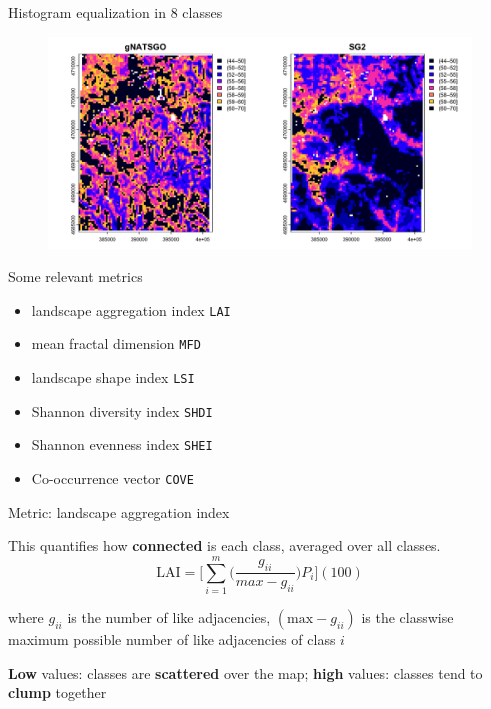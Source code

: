 \documentclass[aspectratio=169, 10pt]{beamer}
\begin{document}
\begin{frame}{Histogram equalization in 8 classes}
    \begin{figure}
        \centering
\includegraphics[height=0.8\textheight]{graphics_david/show.classified-1.png}
    \end{figure}
\end{frame}

\begin{frame}{Some relevant metrics}
\begin{itemize}
    \item landscape aggregation index \texttt{LAI}
    \item mean fractal dimension \texttt{MFD}
    \item landscape shape index \texttt{LSI}
    \item Shannon diversity index \texttt{SHDI}
    \item Shannon evenness index \texttt{SHEI}
    \item Co-occurrence vector \texttt{COVE}
\end{itemize}    
\end{frame}

\begin{frame}{Metric: landscape aggregation index}

This quantifies how \textbf{connected} is each class, averaged over all classes.
    $$\mathrm{LAI} = \Bigg[∑_{i=1}^m \Big( \frac{g_{ii}}{max-g_{ii}} \Big) P_{i} \Bigg](100)$$
    
    where $g_{ii}$ is the number of like adjacencies, $(\mathrm{max}-g_{ii})$ is the classwise maximum possible number of like adjacencies of class $i$
\par
    \textbf{Low} values: classes are \textbf{scattered} over the map; \textbf{high} values: classes tend to \textbf{clump} together
\end{frame}
\end{document}
